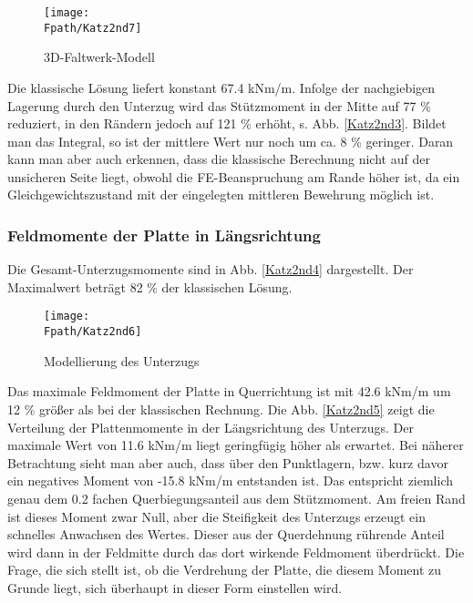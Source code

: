 \begin{figure}[tbp] \centering
\centering
\if {} \sidecaption[t] \fi
\texttt{[image: \\Fpath/Katz2nd7]}
\caption{3D-Faltwerk-Modell  } \label{Katz2nd7}
\end{figure}%


Die klassische L\"{o}sung liefert konstant 67.4 kNm/m. Infolge der nachgiebigen Lagerung durch den Unterzug wird das St\"{u}tzmoment in der Mitte auf 77 \% reduziert, in den R\"{a}ndern jedoch auf 121 \% erh\"{o}ht, s. Abb. \ref{Katz2nd3}. Bildet man das Integral, so ist der mittlere Wert nur noch um ca. 8 \% geringer. Daran kann man aber auch erkennen, dass die klassische Berechnung nicht auf der unsicheren Seite liegt, obwohl die FE-Beanspruchung am Rande h\"{o}her ist, da ein Gleichgewichtszustand mit der eingelegten mittleren Bewehrung m\"{o}glich ist.

{\textcolor{sectionTitleBlue}{\subsubsection*{Feldmomente der Platte in L\"{a}ngsrichtung}}}

Die Gesamt-Unterzugsmomente sind in Abb. \ref{Katz2nd4} dargestellt. Der Maximalwert betr\"{a}gt 82 \% der klassischen L\"{o}sung.

\begin{figure}[tbp] \centering
\centering
\if {} \sidecaption[t] \fi
\texttt{[image: \\Fpath/Katz2nd6]}
\caption{Modellierung des Unterzugs } \label{Katz2nd6}
\end{figure}%


Das maximale Feldmoment der Platte in Querrichtung ist mit 42.6 kNm/m um 12 \% gr\"{o}{\ss}er als bei der klassischen Rechnung. Die Abb. \ref{Katz2nd5} zeigt die Verteilung der Plattenmomente in der L\"{a}ngsrichtung des Unterzugs. Der maximale Wert  von 11.6 kNm/m liegt geringf\"{u}gig h\"{o}her als erwartet. Bei n\"{a}herer Betrachtung sieht man aber auch, dass \"{u}ber den Punktlagern, bzw. kurz davor ein negatives Moment von -15.8 kNm/m entstanden ist. Das entspricht ziemlich genau dem 0.2 fachen Querbiegungsanteil aus dem St\"{u}tzmoment. Am freien Rand ist dieses Moment zwar Null, aber die Steifigkeit des Unterzugs erzeugt ein schnelles Anwachsen des Wertes. Dieser aus der Querdehnung r\"{u}hrende Anteil wird dann in der Feldmitte durch das dort wirkende Feldmoment \"{u}berdr\"{u}ckt. Die Frage, die sich stellt ist, ob die Verdrehung der Platte, die diesem Moment zu Grunde liegt, sich \"{u}berhaupt in dieser Form einstellen wird.

